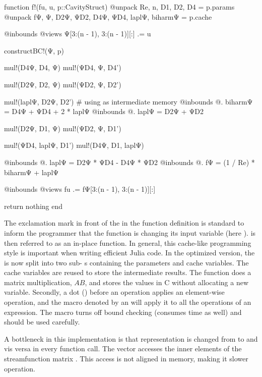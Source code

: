 \begin{jllisting}[caption=Optimized implementation in Julia of the nonlinear
  function $F$ \vspace{4pt}]
function f!(fu, u, p::CavityStruct)
    @unpack Re, n, D1, D2, D4 = p.params
    @unpack fΨ, Ψ, D2Ψ, ΨD2, D4Ψ, ΨD4, laplΨ, biharmΨ = p.cache

    @inbounds @views Ψ[3:(n - 1), 3:(n - 1)][:] .= u

    constructBC!(Ψ, p)

    mul!(D4Ψ, D4, Ψ)
    mul!(ΨD4, Ψ, D4')

    mul!(D2Ψ, D2, Ψ)
    mul!(ΨD2, Ψ, D2')

    mul!(laplΨ, D2Ψ, D2') # using as intermediate memory
    @inbounds @. biharmΨ = D4Ψ + ΨD4 + 2 * laplΨ
    @inbounds @. laplΨ = D2Ψ + ΨD2

    mul!(D2Ψ, D1, Ψ)
    mul!(ΨD2, Ψ, D1')

    mul!(ΨD4, laplΨ, D1')
    mul!(D4Ψ, D1, laplΨ)

    @inbounds @. laplΨ = D2Ψ * ΨD4 - D4Ψ * ΨD2
    @inbounds @. fΨ = (1 / Re) * biharmΨ + laplΨ

    @inbounds @views fu .= fΨ[3:(n - 1), 3:(n - 1)][:]

    return nothing
end
\end{jllisting}

The exclamation mark in front of the  in the function definition is
standard to inform the programmer that the function is changing its input
variable (here ).  is then referred to as an
in-place function. In general, this cache-like programming style is important
when writing efficient Julia code.
In the optimized version, the  is now split into two sub- s containing the parameters and
cache variables. The cache variables are reused to store the intermediate
results. The  function does a matrix multiplication, $AB$,
and stores the values in C without allocating a new variable. Secondly, a dot
() before an operation applies an element-wise operation, and the
macro denoted by an  will apply it to all the operations of an
expression. The  macro turns off bound checking (consumes time
as well) and should be used carefully.

A bottleneck in this implementation is that representation is changed from
 to  and vis versa in every function call. The vector
 accesses the inner elements of the streamfunction matrix .
This access is not aligned in memory, making it slower operation. \\

